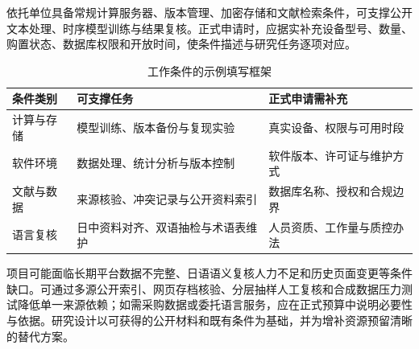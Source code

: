 \GXNSFBodyText

依托单位具备常规计算服务器、版本管理、加密存储和文献检索条件，可支撑公开文本处理、时序模型训练与结果复核。正式申请时，应据实补充设备型号、数量、购置状态、数据库权限和开放时间，使条件描述与研究任务逐项对应。

\begin{table}[htbp]
  \centering
  \fontsize{10}{14}\selectfont
  \caption{工作条件的示例填写框架}
  \begin{tabularx}{\textwidth}{p{}X X}
    \toprule
    条件类别 & 可支撑任务 & 正式申请需补充 \\
    \midrule
    计算与存储 & 模型训练、版本备份与复现实验 & 真实设备、权限与可用时段 \\
    软件环境 & 数据处理、统计分析与版本控制 & 软件版本、许可证与维护方式 \\
    文献与数据 & 来源核验、冲突记录与公开资料索引 & 数据库名称、授权和合规边界 \\
    语言复核 & 日中资料对齐、双语抽检与术语表维护 & 人员资质、工作量与质控办法 \\
    \bottomrule
  \end{tabularx}
  \label{tab:gx-work-condition}
\end{table}

项目可能面临长期平台数据不完整、日语语义复核人力不足和历史页面变更等条件缺口。可通过多源公开索引、网页存档核验、分层抽样人工复核和合成数据压力测试降低单一来源依赖；如需采购数据或委托语言服务，应在正式预算中说明必要性与依据。研究设计以可获得的公开材料和既有条件为基础，并为增补资源预留清晰的替代方案。
